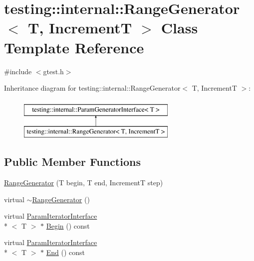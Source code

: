 \hypertarget{classtesting_1_1internal_1_1_range_generator}{\section{testing\-:\-:internal\-:\-:Range\-Generator$<$ T, Increment\-T $>$ Class Template Reference}
\label{classtesting_1_1internal_1_1_range_generator}
}


{\ttfamily \#include $<$gtest.\-h$>$}

Inheritance diagram for testing\-:\-:internal\-:\-:Range\-Generator$<$ T, Increment\-T $>$\-:\begin{figure}[H]
\begin{center}
\leavevmode
\includegraphics[height=2.000000cm]{classtesting_1_1internal_1_1_range_generator}
\end{center}
\end{figure}
\subsection*{Public Member Functions}
\begin{DoxyCompactItemize}
\item 
\hyperlink{classtesting_1_1internal_1_1_range_generator_a5b3b83223b9cada3569bcee729e0fdf3}{Range\-Generator} (T begin, T end, Increment\-T step)
\item 
virtual \hyperlink{classtesting_1_1internal_1_1_range_generator_a680b80b06f471b5f93d8433609017021}{$\sim$\-Range\-Generator} ()
\item 
virtual \hyperlink{classtesting_1_1internal_1_1_param_iterator_interface}{Param\-Iterator\-Interface}\\*
$<$ T $>$ $\ast$ \hyperlink{classtesting_1_1internal_1_1_range_generator_a9e70968c0a928b5f8b5e157ef823d504}{Begin} () const 
\item 
virtual \hyperlink{classtesting_1_1internal_1_1_param_iterator_interface}{Param\-Iterator\-Interface}\\*
$<$ T $>$ $\ast$ \hyperlink{classtesting_1_1internal_1_1_range_generator_a9af92f542fa637b38b82ab240d2d426e}{End} () const 
\end{DoxyCompactItemize}
